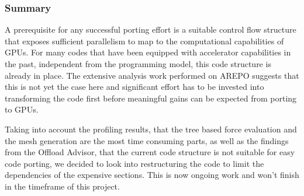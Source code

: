 \documentclass[../main]{subfiles}
\begin{document}
\subsubsection{Summary}
A prerequisite for any successful porting effort is a suitable control flow structure that exposes sufficient parallelism to map to the computational capabilities of GPUs.
For many codes that have been equipped with accelerator capabilities in the past, independent from the programming model, this code structure is already in place.
The extensive analysis work performed on AREPO suggests that this is not yet the case here and significant effort has to be invested into transforming the code first before meaningful gains can be expected from porting to GPUs.

Taking into account the profiling results, that the tree based force evaluation and the mesh generation are the most time consuming parts, as well as the findings from the Offload Advisor, that the current code structure is not suitable for easy code porting, we decided to look into restructuring the code to limit the dependencies of the expensive sections.
This is now ongoing work and won't finish in the timeframe of this project.





\end{document}
